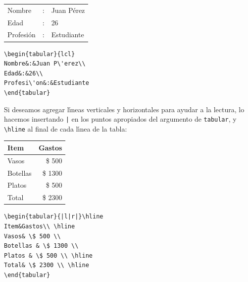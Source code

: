 {\vspace{.3cm}
{\small
\begin{minipage}[c]{5cm}
\begin{tabular}{lcl}
Nombre&:&Juan P\'erez\\
Edad&:&26\\
Profesi\'on&:&Estudiante
\end{tabular}
\end{minipage}
\hspace{2cm}
\begin{minipage}[c]{5cm}
\begin{verbatim}
\begin{tabular}{lcl}
Nombre&:&Juan P\'erez\\
Edad&:&26\\
Profesi\'on&:&Estudiante
\end{tabular}
\end{verbatim}
\end{minipage}
}
\vspace{.3cm}

Si deseamos agregar l{\'\i}neas verticales y horizontales para ayudar a
la lectura, lo hacemos insertando \verb+|+ en los puntos apropiados
del argumento de \verb+tabular+, y \verb+\hline+ al final de cada
l\'{\i}nea de la tabla:

\vspace{.3cm}
{\small
\begin{minipage}[c]{5cm}
\begin{tabular}{|l|r|}\hline
Item&Gastos\\ \hline
Vasos& \$ 500 \\
Botellas & \$ 1300 \\
Platos & \$ 500 \\ \hline
Total& \$ 2300 \\ \hline
\end{tabular}
\end{minipage}
\hspace{2cm}
\begin{minipage}[c]{5cm}
\begin{verbatim}
\begin{tabular}{|l|r|}\hline
Item&Gastos\\ \hline
Vasos& \$ 500 \\
Botellas & \$ 1300 \\
Platos & \$ 500 \\ \hline
Total& \$ 2300 \\ \hline
\end{tabular}
\end{verbatim}
\end{minipage}
}
\vspace{.3cm}

}
